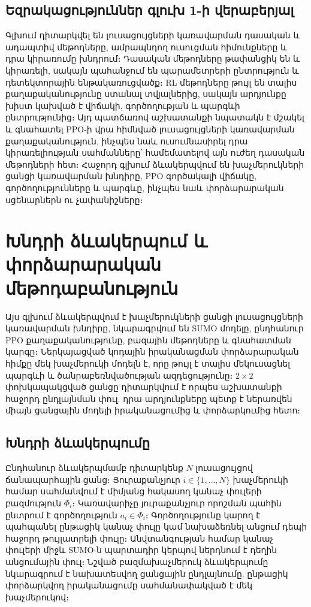 \documentclass[12pt,a4paper]{extreport}
\begin{document}
\section{Եզրակացություններ գլուխ 1-ի վերաբերյալ}

Գլխում դիտարկվել են լուսացույցների կառավարման դասական և ադապտիվ մեթոդները, ամրապնդող ուսուցման հիմունքները և դրա կիրառումը խնդրում։ Դասական մեթոդները թափանցիկ են և կիրառելի, սակայն պահանջում են պարամետրերի ընտրություն և դետեկտորային ենթակառուցվածք։ RL մեթոդները թույլ են տալիս քաղաքականությունը ստանալ տվյալներից, սակայն արդյունքը խիստ կախված է վիճակի, գործողության և պարգևի ընտրությունից։ Այդ պատճառով աշխատանքի նպատակն է մշակել և գնահատել PPO-ի վրա հիմնված լուսացույցների կառավարման քաղաքականություն, ինչպես նաև ուսումնասիրել դրա կիրառելիության սահմանները՝ համեմատելով այն ուժեղ դասական մեթոդների հետ։ Հաջորդ գլխում ձևակերպվում են խաչմերուկների ցանցի կառավարման խնդիրը, PPO գործակալի վիճակը, գործողությունները և պարգևը, ինչպես նաև փորձարարական սցենարներն ու չափանիշները։

\chapter{Խնդրի ձևակերպում և փորձարարական մեթոդաբանություն}

Այս գլխում ձևակերպվում է խաչմերուկների ցանցի լուսացույցների կառավարման խնդիրը, նկարագրվում են SUMO մոդելը, ընդհանուր PPO քաղաքականությունը, բազային մեթոդները և գնահատման կարգը։ Ներկայացված կոդային իրականացման փորձարարական հիմքը մեկ խաչմերուկի մոդելն է, որը թույլ է տալիս մեկուսացնել պարգևի և ծանրաբեռնվածության ազդեցությունը։ $2\times2$ փոխկապակցված ցանցը դիտարկվում է որպես աշխատանքի հաջորդ ընդլայնման փուլ. դրա արդյունքները պետք է ներառվեն միայն ցանցային մոդելի իրականացումից և փորձարկումից հետո։

\section{Խնդրի ձևակերպումը}

Ընդհանուր ձևակերպմամբ դիտարկենք $N$ լուսացույցով ճանապարհային ցանց։ Յուրաքանչյուր $i\in\{1,\ldots,N\}$ խաչմերուկի համար սահմանվում է միմյանց հակասող կանաչ փուլերի բազմություն $\Phi_i$։ Կառավարիչը յուրաքանչյուր որոշման պահին ընտրում է գործողություն $a_i\in\Phi_i$։ Գործողությունը կարող է պահպանել ընթացիկ կանաչ փուլը կամ նախաձեռնել անցում դեպի հաջորդ թույլատրելի փուլը։ Անվտանգության համար կանաչ փուլերի միջև SUMO-ն պարտադիր կերպով ներդնում է դեղին անցումային փուլ։ Նշված բազմախաչմերուկ ձևակերպումը նկարագրում է նախատեսվող ցանցային ընդլայնումը. ընթացիկ փորձարկվող իրականացումը սահմանափակված է մեկ խաչմերուկով։
\end{document}

